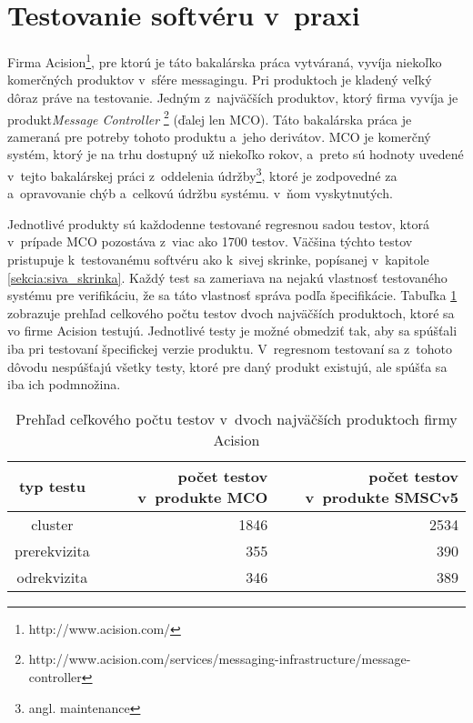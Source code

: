 \section{Testovanie softvéru v~praxi} 
\label{sekcia:testovanie_v_praxi}
Firma Acision\footnote{http://www.acision.com/}, pre ktorú je táto 
bakalárska práca vytváraná, vyvíja niekoľko komerčných produktov
v~sfére messagingu. Pri produktoch je kladený veľký dôraz práve na testovanie.
Jedným z~najväčších produktov, ktorý firma vyvíja je produkt\textit{Message Controller} 
\footnote{http://www.acision.com/services/messaging-infrastructure/message-controller}
(ďalej len MCO).
Táto bakalárska práca je zameraná pre potreby tohoto produktu a~jeho 
derivátov. MCO je komerčný systém, ktorý je na trhu dostupný už niekoľko 
rokov, a~preto sú hodnoty uvedené v~tejto bakalárskej práci z~oddelenia 
údržby\footnote{angl. maintenance}, ktoré je zodpovedné za a~opravovanie 
chýb a~celkovú údržbu systému.
v~ňom vyskytnutých. 

Jednotlivé produkty sú každodenne testované regresnou 
sadou testov, ktorá v~prípade MCO pozostáva z~viac ako 1700 testov.
Väčšina týchto testov pristupuje k~testovanému softvéru ako k~sivej 
skrinke, popísanej v~kapitole \ref{sekcia:siva_skrinka}.
Každý test sa zameriava na nejakú vlastnosť testovaného systému pre 
verifikáciu, že sa táto vlastnosť správa podľa špecifikácie.
Tabuľka \ref{tabulka:pocet_testov} zobrazuje prehľad celkového počtu 
testov dvoch najväčších produktoch, ktoré sa vo firme Acision testujú.
Jednotlivé testy je možné obmedziť tak, aby sa spúšťali iba pri testovaní
špecifickej verzie produktu. V~regresnom testovaní sa z~tohoto dôvodu nespúšťajú
všetky testy, ktoré pre daný produkt existujú, ale spúšťa sa iba ich podmnožina.


\begin{table}
  \begin{center}
    \begin{tabular}{| c | r | r |}
    \hline
    typ testu & počet testov v~produkte MCO & počet testov v~produkte SMSCv5 \\ \hline
    cluster & 1846 & 2534 \\ \hline
    prerekvizita & 355 & 390 \\ \hline
    odrekvizita & 346 & 389 \\
    \hline
    \end{tabular}
    \caption{Prehľad ceľkového počtu testov v~dvoch najväčších produktoch firmy Acision}
    \label{tabulka:pocet_testov}
  \end{center}
\end{table}

